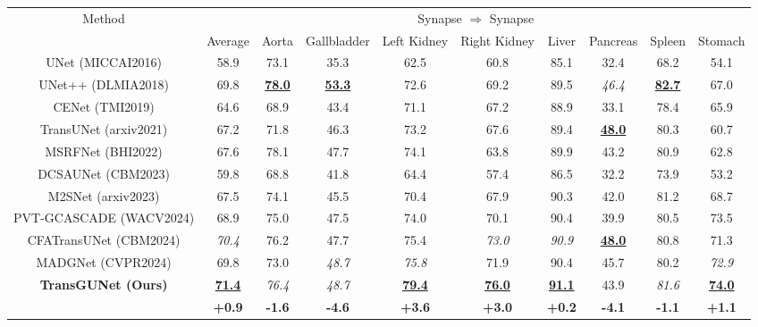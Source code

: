 \begin{table*}[t]
    \centering
    \scriptsize
    \setlength\tabcolsep{9pt} %
    \renewcommand{\arraystretch}{0.6} %
    \begin{tabular}{c|c|cccccccc}
    \hline
    \multicolumn{1}{c|}{\multirow{2}{*}{Method}} & \multicolumn{9}{c}{Synapse $\Rightarrow$ Synapse} \\ \cline{2-10}
     & Average & Aorta & Gallbladder & Left Kidney & Right Kidney & Liver & Pancreas & Spleen & Stomach \\
    \hline
    UNet \tiny{(MICCAI2016)}     & 58.9 & 73.1 & 35.3 & 62.5 & 60.8 & 85.1 & 32.4 & 68.2 & 54.1 \\
    UNet++ \tiny{(DLMIA2018)}    & 69.8 & \textbf{\underline{78.0}} & \textbf{\underline{53.3}} & 72.6 & 69.2 & 89.5 & \textit{46.4} & \textbf{\underline{82.7}} & 67.0 \\
    CENet \tiny{(TMI2019)}       & 64.6 & 68.9 & 43.4 & 71.1 & 67.2 & 88.9 & 33.1 & 78.4 & 65.9 \\
    TransUNet \tiny{(arxiv2021)} & 67.2 & 71.8 & 46.3 & 73.2 & 67.6 & 89.4 & \textbf{\underline{48.0}} & 80.3 & 60.7 \\
    MSRFNet \tiny{(BHI2022)}     & 67.6 & 78.1 & 47.7 & 74.1 & 63.8 & 89.9 & 43.2 & 80.9 & 62.8 \\
    DCSAUNet \tiny{(CBM2023)}    & 59.8 & 68.8 & 41.8 & 64.4 & 57.4 & 86.5 & 32.2 & 73.9 & 53.2 \\
    M2SNet \tiny{(arxiv2023)}    & 67.5 & 74.1 & 45.5 & 70.4 & 67.9 & 90.3 & 42.0 & 81.2 & 68.7 \\
    PVT-GCASCADE \tiny{(WACV2024)} & 68.9 & 75.0 & 47.5 & 74.0 & 70.1 & 90.4 & 39.9 & 80.5 & 73.5 \\
    CFATransUNet \tiny{(CBM2024)} & \textit{70.4} & 76.2 & 47.7 & 75.4 & \textit{73.0} & \textit{90.9} & \textbf{\underline{48.0}} & 80.8 & 71.3 \\
    MADGNet \tiny{(CVPR2024)}    & 69.8 & 73.0 & \textit{48.7} & \textit{75.8} & 71.9 & 90.4 & 45.7 & 80.2 & \textit{72.9} \\
    \hline
    \multicolumn{1}{c|}{\multirow{2}{*}{\textbf{TransGUNet \tiny{(Ours)}}}} & \textbf{\underline{71.4}} & \textit{76.4} & \textit{48.7} & \textbf{\underline{79.4}} & \textbf{\underline{76.0}} & \textbf{\underline{91.1}} & 43.9 & \textit{81.6} & \textbf{\underline{74.0}} \\ \cline{2-10}
    & \textbf{+0.9} & \textbf{-1.6} & \textbf{-4.6} & \textbf{+3.6} & \textbf{+3.0} & \textbf{+0.2} & \textbf{-4.1} & \textbf{-1.1} & \textbf{+1.1} \\

\end{tabular}
\end{table*}
